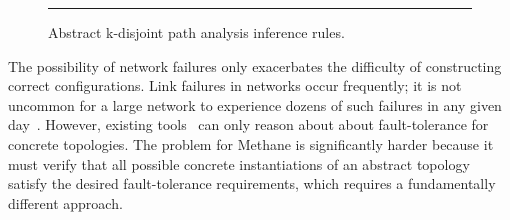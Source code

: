 \documentclass[numbers, 10pt, preprint]{sigplanconf}
\newcommand{\sysname}{{\small \sf Methane}\xspace}
\begin{document}
\begin{figure}[t!]
  \begin{minipage}[t]{\linewidth}%
  \end{minipage}

  \vspace*{1em}
  \begin{minipage}[t]{\linewidth}%
  \end{minipage}

  \hrule
  \vspace*{1em}
  \caption{Abstract k-disjoint path analysis inference rules.}
  \label{fig:inference-rules}
  \vspace{-1.4em}
\end{figure}



The possibility of network failures only exacerbates the difficulty of constructing correct configurations. 
Link failures in networks occur frequently; it is not uncommon for a large network to experience dozens of such failures in any given day~\cite{dc-failure-study}. However, existing tools~\cite{condor,propane} can only reason about about fault-tolerance for concrete topologies. The problem for \sysname is significantly harder because it must verify that all possible concrete instantiations of an abstract topology satisfy the desired fault-tolerance requirements, which requires a fundamentally different approach.
\end{document}
